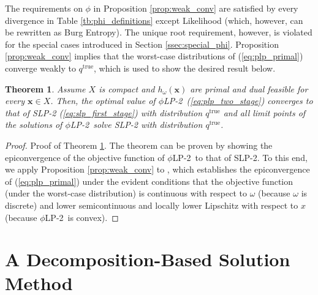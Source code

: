 \documentclass[12pt]{article}
\newcommand{\x}{\mathbf{x}}
\newcommand{\qtrue}{q^{\text{true}}}
\theoremstyle{plain}
\newtheorem{theorem}{Theorem}
\theoremstyle{definition}
\theoremstyle{remark}
\newcommand{\plp}{$\phi$LP-2}
\begin{document}
The requirements on $\phi$ in Proposition \ref{prop:weak_conv} are satisfied by every divergence in Table \ref{tb:phi_definitions} except Likelihood (which, however, can be rewritten as Burg Entropy).
The unique root requirement, however, is violated for the special cases introduced in Section \ref{ssec:special_phi}.
Proposition \ref{prop:weak_conv} implies that the worst-case distributions of (\ref{eq:plp_primal}) converge weakly to $\qtrue$, which is used to show the desired result below. 
\begin{theorem}
	\label{thm:epiconvergence}
	Assume $X$ is compact and $h_\omega(\x)$ are primal and dual feasible for every $\x \in X$.
	Then, the optimal value of \plp\ (\ref{eq:plp_two_stage}) converges to that of SLP-2 (\ref{eq:slp_first_stage}) with distribution $\qtrue$ and all limit points of the solutions of \plp\ solve SLP-2 with distribution $\qtrue$.
\end{theorem}

\begin{proof}{\sc Proof of Theorem \ref{thm:epiconvergence}.}
	The theorem can be proven by showing the epiconvergence of the objective function of \plp\ to that of SLP-2.
    To this end, we apply Proposition \ref{prop:weak_conv} to \citep[Theorem 3.7]{dupacova1988asymptotic}, which establishes the epiconvergence of (\ref{eq:plp_primal}) under the evident conditions that the objective function (under the worst-case distribution) is continuous with respect to $\omega$ (because $\omega$ is discrete) and lower semicontinuous and locally lower Lipschitz with respect to $x$ (because \plp\ is convex).
    \Halmos
\end{proof}

\section{A Decomposition-Based Solution Method}
\label{sec:soln_algorithm}
\end{document}
